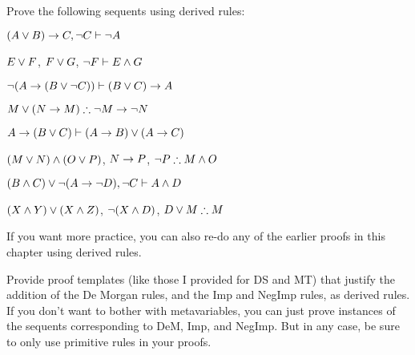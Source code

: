 \problempart 
Prove the following sequents using derived rules:
\begin{earg}
\item $(A \vee B) \rightarrow C , \neg C \vdash \neg A$
\item $E\vee F$, $F\vee G$, $\neg F \vdash E \wedge G$
\item $\neg (A \rightarrow (B \vee \neg C)) \vdash (B \vee C) \rightarrow A$
\item $M\vee(N\rightarrow M) \therefore \neg M \rightarrow \neg N$
\item $A \rightarrow (B \vee C) \vdash (A \rightarrow B) \vee (A \rightarrow C)$
\item $(M \vee N) \wedge (O \vee P)$, $N \rightarrow P$, $\neg P \therefore M\wedge O$
\item $(B \wedge C) \vee \neg (A \rightarrow \neg D), \neg C \vdash A \wedge D$
\item $(X\wedge Y)\vee(X\wedge Z)$, $\neg(X\wedge D)$, $D\vee M \therefore M$
\end{earg}
If you want more practice, you can also re-do any of the earlier proofs in this chapter using derived rules.

\problempart
Provide proof templates (like those I provided for DS and MT) that justify the addition of the De Morgan rules, and the Imp and NegImp rules, as derived rules. If you don't want to bother with metavariables, you can just prove instances of the sequents corresponding to DeM, Imp, and NegImp.  But in any case, be sure to only use primitive rules in your proofs.

